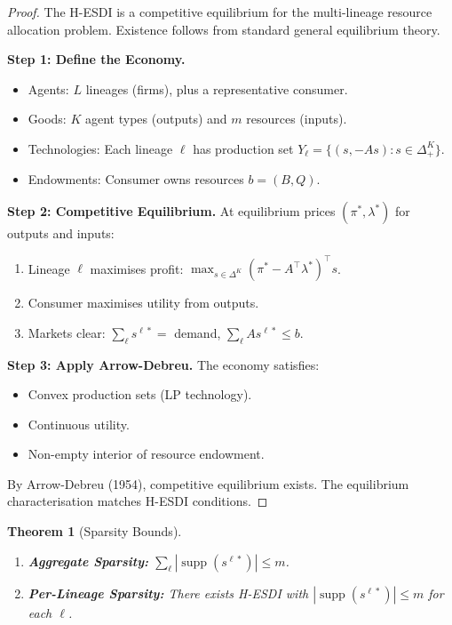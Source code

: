 \documentclass[12pt]{article}
\newtheorem{theorem}{Theorem}[section]
\DeclareMathOperator{\supp}{supp}
\begin{document}
\begin{proof}
The H-ESDI is a competitive equilibrium for the multi-lineage resource allocation problem. Existence follows from standard general equilibrium theory.

\textbf{Step 1: Define the Economy.}
\begin{itemize}
    \item Agents: $L$ lineages (firms), plus a representative consumer.
    \item Goods: $K$ agent types (outputs) and $m$ resources (inputs).
    \item Technologies: Each lineage $\ell$ has production set $Y_\ell = \{(s, -As) : s \in \Delta_+^K\}$.
    \item Endowments: Consumer owns resources $b = (B, Q)$.
\end{itemize}

\textbf{Step 2: Competitive Equilibrium.}
At equilibrium prices $(\pi^*, \lambda^*)$ for outputs and inputs:
\begin{enumerate}
    \item Lineage $\ell$ maximises profit: $\max_{s \in \Delta^K} (\pi^* - A^\top \lambda^*)^\top s$.
    \item Consumer maximises utility from outputs.
    \item Markets clear: $\sum_\ell s^{\ell*} = $ demand, $\sum_\ell A s^{\ell*} \leq b$.
\end{enumerate}

\textbf{Step 3: Apply Arrow-Debreu.}
The economy satisfies:
\begin{itemize}
    \item Convex production sets (LP technology).
    \item Continuous utility.
    \item Non-empty interior of resource endowment.
\end{itemize}
By Arrow-Debreu (1954), competitive equilibrium exists. The equilibrium characterisation matches H-ESDI conditions.
\end{proof}

\begin{theorem}[Sparsity Bounds]
\begin{enumerate}
    \item \textbf{Aggregate Sparsity:} $\sum_\ell |\supp(s^{\ell*})| \leq m$.
    \item \textbf{Per-Lineage Sparsity:} There exists H-ESDI with $|\supp(s^{\ell*})| \leq m$ for each $\ell$.
\end{enumerate}
\end{theorem}
\end{document}
